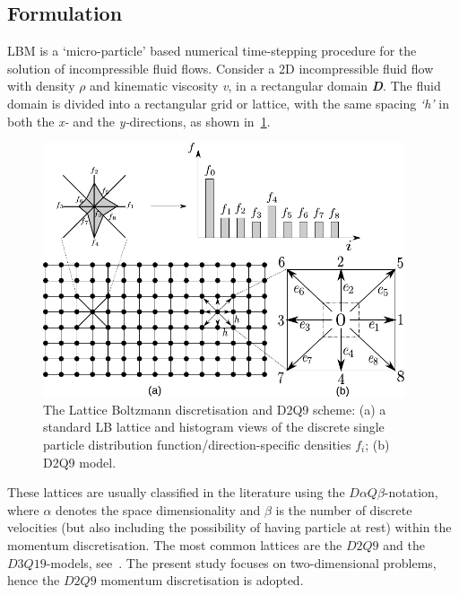 \subsection{Formulation}

LBM is a `micro-particle' based numerical 
time-stepping procedure for the solution of incompressible 
fluid flows. Consider a 2D incompressible fluid flow with 
density $\rho$ and kinematic viscosity \textit{v}, in a 
rectangular domain \textit{\textbf{D}}. The fluid domain is 
divided into a rectangular grid or lattice, with the same 
spacing \textit{`h'} in both the \textit{x-} and the 
\textit{y-}directions, as shown in~\cref{fig:D2Q9}. 

\begin{figure}[htpb]
	\centering
	\includegraphics[width=0.95\textwidth]{D2Q9}
	\caption[The Lattice Boltzmann discretisation and D2Q9 scheme]{The Lattice 
	Boltzmann discretisation and D2Q9 scheme: (a) a standard LB lattice and 
	histogram views of the discrete single particle distribution 
	function/direction-specific densities $f_i$; (b) D2Q9 model.}
	\label{fig:D2Q9}
\end{figure}

These lattices are usually classified in the literature using 
the $\mathit{D}\alpha\mathit{Q}\beta$-notation, where $\alpha$ 
denotes the space dimensionality and $\beta$ is the number of 
discrete velocities (but also including the possibility of 
having particle at rest) within the momentum discretisation. 
The most common lattices are the $\mathit{D2Q9}$ and the 
$\mathit{D3Q19}$-models, see~\citet{He1997}. The present study 
focuses on two-dimensional problems, hence the $\mathit{D2Q9}$ 
momentum discretisation is adopted.

